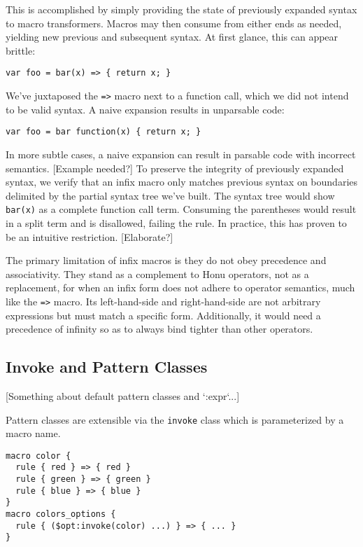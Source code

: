 \documentclass[preprint,10pt]{sigplanconf}
\begin{document}
This is accomplished by simply providing the state of previously
expanded syntax to macro transformers. Macros may then consume from
either ends as needed, yielding new previous and subsequent syntax. At
first glance, this can appear brittle:

\begin{verbatim}
var foo = bar(x) => { return x; }
\end{verbatim}

We've juxtaposed the \verb!=>! macro next to a function call, which we did
not intend to be valid syntax. A naive expansion results in unparsable
code:

\begin{verbatim}
var foo = bar function(x) { return x; }
\end{verbatim}

In more subtle cases, a naive expansion can result in parsable code
with incorrect semantics. [Example needed?] To preserve the integrity
of previously expanded syntax, we verify that an infix macro only
matches previous syntax on boundaries delimited by the partial syntax
tree we've built. The syntax tree would show \verb!bar(x)! as a complete
function call term. Consuming the parentheses would result in a split
term and is disallowed, failing the rule. In practice, this has proven
to be an intuitive restriction. [Elaborate?]

The primary limitation of infix macros is they do not obey precedence
and associativity. They stand as a complement to Honu operators, not
as a replacement, for when an infix form does not adhere to operator
semantics, much like the \verb!=>! macro. Its left-hand-side and
right-hand-side are not arbitrary expressions but must match a
specific form. Additionally, it would need a precedence of infinity so
as to always bind tighter than other operators.

\subsection{Invoke and Pattern Classes}
\label{sec-4-2}

[Something about default pattern classes and `:expr`...]

Pattern classes are extensible via the \verb!invoke! class which is
parameterized by a macro name.

\begin{verbatim}
macro color {
  rule { red } => { red }
  rule { green } => { green }
  rule { blue } => { blue }
}
macro colors_options {
  rule { ($opt:invoke(color) ...) } => { ... }
}
\end{verbatim}
\end{document}
